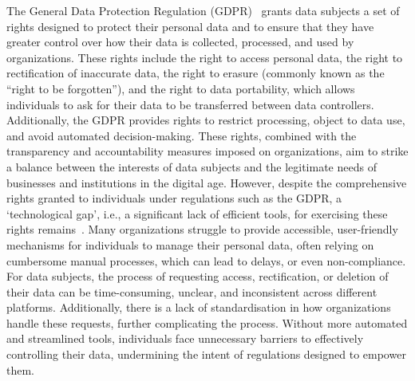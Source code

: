 \documentclass{IOS-Book-Article}     %
\begin{document}
The General Data Protection Regulation (GDPR)~\cite{gdpr} grants data subjects a set of rights designed to protect their personal data and to ensure that they have greater control over how their data is collected, processed, and used by organizations.
These rights include the right to access personal data, the right to rectification of inaccurate data, the right to erasure (commonly known as the ``right to be forgotten''), and the right to data portability, which allows individuals to ask for their data to be transferred between data controllers.
Additionally, the GDPR provides rights to restrict processing, object to data use, and avoid automated decision-making.
These rights, combined with the transparency and accountability measures imposed on organizations, aim to strike a balance between the interests of data subjects and the legitimate needs of businesses and institutions in the digital age.
However, despite the comprehensive rights granted to individuals under regulations such as the GDPR, a `technological gap', i.e., a significant lack of efficient tools, for exercising these rights remains~\cite{bernes_enhancing_2022}.
Many organizations struggle to provide accessible, user-friendly mechanisms for individuals to manage their personal data, often relying on cumbersome manual processes, which can lead to delays, or even non-compliance.
For data subjects, the process of requesting access, rectification, or deletion of their data can be time-consuming, unclear, and inconsistent across different platforms.
Additionally, there is a lack of standardisation in how organizations handle these requests, further complicating the process.
Without more automated and streamlined tools, individuals face unnecessary barriers to effectively controlling their data, undermining the intent of regulations designed to empower them.
\end{document}

